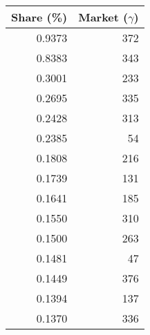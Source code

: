 \begin{tabular}{rr}
\toprule
 Share (\%) &  Market ($\gamma$) \\
\midrule
     0.9373 &                372 \\
     0.8383 &                343 \\
     0.3001 &                233 \\
     0.2695 &                335 \\
     0.2428 &                313 \\
     0.2385 &                 54 \\
     0.1808 &                216 \\
     0.1739 &                131 \\
     0.1641 &                185 \\
     0.1550 &                310 \\
     0.1500 &                263 \\
     0.1481 &                 47 \\
     0.1449 &                376 \\
     0.1394 &                137 \\
     0.1370 &                336 \\
\bottomrule
\end{tabular}
